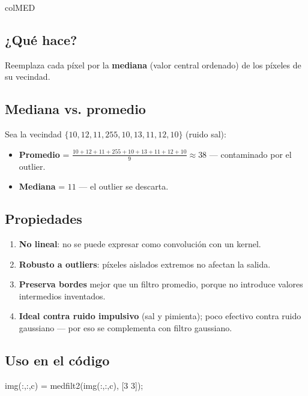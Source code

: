 \documentclass[11pt,a4paper]{article}
\begin{document}
\begin{keybox}{colMED}

\subsection*{¿Qué hace?}

Reemplaza cada píxel por la \textbf{mediana} (valor central ordenado) de los
píxeles de su vecindad.

\subsection*{Mediana vs. promedio}

Sea la vecindad \(\{10, 12, 11, 255, 10, 13, 11, 12, 10\}\) (ruido sal):
\begin{itemize}
    \item \textbf{Promedio} = \(\frac{10+12+11+255+10+13+11+12+10}{9} \approx 38\) — contaminado por el outlier.
    \item \textbf{Mediana} = \(11\) — el outlier se descarta.
\end{itemize}

\subsection*{Propiedades}

\begin{enumerate}
    \item \textbf{No lineal}: no se puede expresar como convolución con un kernel.
    \item \textbf{Robusto a outliers}: píxeles aislados extremos no afectan la salida.
    \item \textbf{Preserva bordes} mejor que un filtro promedio, porque no introduce valores intermedios inventados.
    \item \textbf{Ideal contra ruido impulsivo} (sal y pimienta); poco efectivo contra ruido gaussiano — por eso se complementa con filtro gaussiano.
\end{enumerate}

\subsection*{Uso en el código}

\begin{codebox}
img(:,:,c) = medfilt2(img(:,:,c), [3 3]);
\end{codebox}

\end{keybox}
\end{document}
